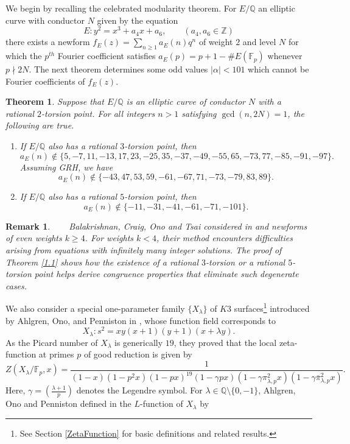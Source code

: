 \documentclass[12pt]{amsart}
\newtheorem*{remark}{Remark}
\newtheorem{thm}{Theorem}[section]
\newcommand{\Z}{\mathbb{Z}}
\newcommand{\Q}{\mathbb{Q}}
\newcommand{\F}{\mathbb{F}}
\newcommand{\pil}{\pi_{\lambda,p}}
\newcommand{\pilb}{\bar{\pi}_{\lambda,p}}
\numberwithin{equation}{section}
\begin{document}
We begin by recalling the celebrated modularity theorem. For $E/\Q$ an elliptic curve with conductor $N$ given by the equation
\begin{equation}
\label{eqn:MT}
    E:y^2=x^3+a_4x+a_6, \qquad(a_4,a_6\in\Z)
\end{equation} 
 there exists a newform $f_E(z)=\sum_{n\geq 1}a_E(n)q^n$ of weight $2$ and level $N$ for which the $p^{th}$ Fourier coefficient satisfies $a_E(p)=p+1-\#E(\F_p)$ whenever $p\nmid 2N$. The next theorem determines some odd values $|\alpha|<101$ which cannot be Fourier coefficients of $f_E(z)$. 
\begin{thm}{\label{1.1}}
Suppose that $E/\mathbb{Q}$ is an elliptic curve of conductor $N$ with a rational $2$-torsion point. For all integers $n>1$ satisfying $\gcd (n,2N)=1$, the following are true.
\begin{enumerate}
    \item If $E/\Q$ also has a rational $3$-torsion point, then $$a_E(n)\not \in \{5, -7, 11, -13, 17, 23, -25, 35, -37,-49, -55, 65,  -73,77, -85, -91, -97\}.$$ Assuming GRH, we have $$a_E(n)\not \in \{-43, 47, 53, 59, -61, -67, 71, -73, -79, 83, 89\}.$$
    \item If $E/\Q$ also has a rational $5$-torsion point, then $$a_E(n)\not \in \{ -11, -31, -41, -61, -71, -101\}.$$
\end{enumerate}
\end{thm}
\begin{remark}\ \ \ \smallskip\newline
\noindent
Balakrishnan, Craig, Ono and Tsai considered in \cite{BCO} and \cite{BCOT} newforms of even weights $k\geq 4$. For weights $k<4$, their method encounters difficulties arising from equations with infinitely many integer solutions. The proof of Theorem \ref{1.1} shows how the existence of a rational $3$-torsion or a rational $5$-torsion point helps derive congruence properties that eliminate such degenerate cases. 
\end{remark}
We also consider a special one-parameter family $\{X_\lambda\}$ of $K3$ surfaces\footnote{See Section \ref{ZetaFunction} for basic definitions and related results.} introduced by Ahlgren, Ono, and Penniston in \cite{AOP}, whose function field corresponds to 
\begin{equation}
    X_{\lambda}: s^2=xy(x+1)(y+1)(x+\lambda y).
\end{equation}
As the Picard number of $X_{\lambda}$ is generically $19$, they proved that the local zeta-function at primes $p$ of good reduction is given by $$Z(X_\lambda/\F_p,x)=\frac{1}{(1-x)(1-p^2x)(1-px)^{19}(1-\gamma px)(1-\gamma\pil^2x)(1-\gamma\pilb^2x)}.$$ Here, $\gamma=\left(\frac{\lambda+1}{p}\right)$ denotes the Legendre symbol. For $\lambda\in\mathbb{Q}\setminus\{0,-1\}$, Ahlgren, Ono and Penniston defined in \cite{AOP} the $L$-function of $X_\lambda$ by 
\end{document}
